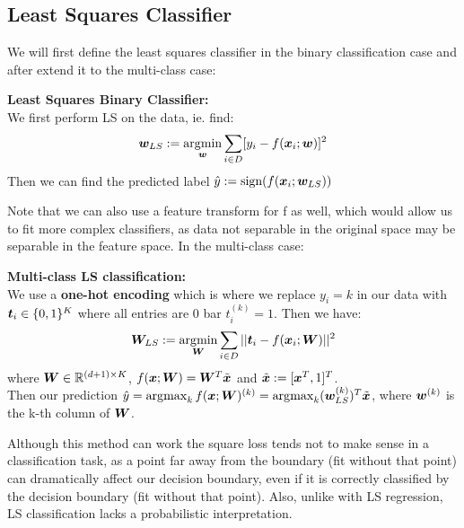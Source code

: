 \subsection{Least Squares Classifier}
We will first define the least squares classifier in the binary classification case and after extend it to the multi-class case:
\begin{definition}
    \textbf{Least Squares Binary Classifier:} \\
    We first perform LS on the data, ie. find:
    \begin{equation}
        \bm{w}_{LS} := \operatorname*{arg\!\min}_{\bm{w}} \sum_{i \in D} [y_{i} - f(\bm{x}_{i} ; \bm{w})]^{2}
    \end{equation}
    Then we can find the predicted label $\hat{y}:= \text{sign}(f(\bm{x}_{i};\bm{w}_{LS}))$
\end{definition}
Note that we can also use a feature transform for f as well, which would allow us to fit more complex classifiers, as data not separable in the original space may be separable in the feature space. In the multi-class case:
\begin{definition}
    \textbf{Multi-class LS classification:} \\
    We use a \textbf{one-hot encoding} which is where we replace $y_{i}=k$ in our data with $\bm{t}_{i} \in \{0,1\}^{K}$ where all entries are 0 bar $t_{i}^{(k)}=1$. Then we have:
    \begin{equation}
        \bm{W}_{LS} := \operatorname*{arg\!\min}_{\bm{W}} \sum_{i \in D} ||\bm{t}_{i} - f(\bm{x}_{i} ; \bm{W})||^{2}
    \end{equation}
    where $\bm{W} \in \mathbb{R}^{(d+1) \times K}$, $f(\bm{x};\bm{W})=\bm{W}^{T} \tilde{\bm{x}}$ and $\tilde{\bm{x}} := [\bm{x}^{T}, 1]^{T}$.\\
    Then our prediction $\hat{y} = \operatorname*{arg\!\max}_{k} f(\bm{x};\bm{W})^{(k)} = \operatorname*{arg\!\max}_{k}(\bm{w}_{LS}^{(k)})^{T} \tilde{\bm{x}}$, where $\bm{w}^{(k)}$ is the k-th column of $\bm{W}$.
\end{definition}
Although this method can work the square loss tends not to make sense in a classification task, as a point far away from the boundary (fit without that point) can dramatically affect our decision boundary, even if it is correctly classified by the decision boundary (fit without that point). Also, unlike with LS regression, LS classification lacks a probabilistic interpretation.

